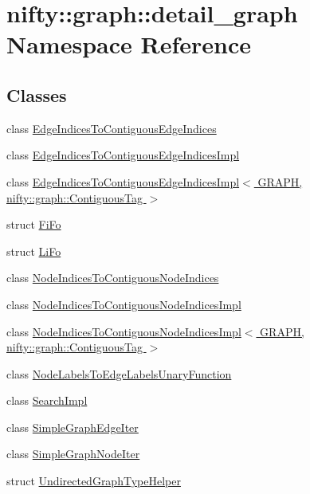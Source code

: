 \hypertarget{namespacenifty_1_1graph_1_1detail__graph}{}\section{nifty\+:\+:graph\+:\+:detail\+\_\+graph Namespace Reference}
\label{namespacenifty_1_1graph_1_1detail__graph}
\subsection*{Classes}
\begin{DoxyCompactItemize}
\item 
class \hyperlink{classnifty_1_1graph_1_1detail__graph_1_1EdgeIndicesToContiguousEdgeIndices}{Edge\+Indices\+To\+Contiguous\+Edge\+Indices}
\item 
class \hyperlink{classnifty_1_1graph_1_1detail__graph_1_1EdgeIndicesToContiguousEdgeIndicesImpl}{Edge\+Indices\+To\+Contiguous\+Edge\+Indices\+Impl}
\item 
class \hyperlink{classnifty_1_1graph_1_1detail__graph_1_1EdgeIndicesToContiguousEdgeIndicesImpl_3_01GRAPH_00_01ni85a4007f22b365a25e3bd0829bce5cfc}{Edge\+Indices\+To\+Contiguous\+Edge\+Indices\+Impl$<$ G\+R\+A\+P\+H, nifty\+::graph\+::\+Contiguous\+Tag $>$}
\item 
struct \hyperlink{structnifty_1_1graph_1_1detail__graph_1_1FiFo}{Fi\+Fo}
\item 
struct \hyperlink{structnifty_1_1graph_1_1detail__graph_1_1LiFo}{Li\+Fo}
\item 
class \hyperlink{classnifty_1_1graph_1_1detail__graph_1_1NodeIndicesToContiguousNodeIndices}{Node\+Indices\+To\+Contiguous\+Node\+Indices}
\item 
class \hyperlink{classnifty_1_1graph_1_1detail__graph_1_1NodeIndicesToContiguousNodeIndicesImpl}{Node\+Indices\+To\+Contiguous\+Node\+Indices\+Impl}
\item 
class \hyperlink{classnifty_1_1graph_1_1detail__graph_1_1NodeIndicesToContiguousNodeIndicesImpl_3_01GRAPH_00_01ni9b1f0e77953ef9967804436d9931bab9}{Node\+Indices\+To\+Contiguous\+Node\+Indices\+Impl$<$ G\+R\+A\+P\+H, nifty\+::graph\+::\+Contiguous\+Tag $>$}
\item 
class \hyperlink{classnifty_1_1graph_1_1detail__graph_1_1NodeLabelsToEdgeLabelsUnaryFunction}{Node\+Labels\+To\+Edge\+Labels\+Unary\+Function}
\item 
class \hyperlink{classnifty_1_1graph_1_1detail__graph_1_1SearchImpl}{Search\+Impl}
\item 
class \hyperlink{classnifty_1_1graph_1_1detail__graph_1_1SimpleGraphEdgeIter}{Simple\+Graph\+Edge\+Iter}
\item 
class \hyperlink{classnifty_1_1graph_1_1detail__graph_1_1SimpleGraphNodeIter}{Simple\+Graph\+Node\+Iter}
\item 
struct \hyperlink{structnifty_1_1graph_1_1detail__graph_1_1UndirectedGraphTypeHelper}{Undirected\+Graph\+Type\+Helper}
\end{DoxyCompactItemize}
